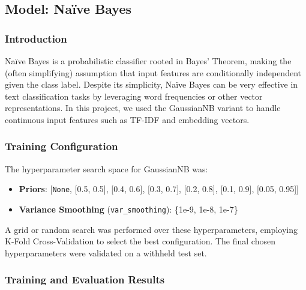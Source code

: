 \subsection{Model: Naïve Bayes}

\subsubsection{Introduction}

Naïve Bayes is a probabilistic classifier rooted in Bayes’ Theorem, making the (often simplifying) assumption that input features are conditionally independent given the class label. Despite its simplicity, Naïve Bayes can be very effective in text classification tasks by leveraging word frequencies or other vector representations. In this project, we used the GaussianNB variant to handle continuous input features such as TF-IDF and embedding vectors.

\subsubsection{Training Configuration}

The hyperparameter search space for GaussianNB was:

\begin{itemize}
    \item \textbf{Priors}: [\texttt{None}, [0.5, 0.5], [0.4, 0.6], [0.3, 0.7], [0.2, 0.8], [0.1, 0.9], [0.05, 0.95]]
    \item \textbf{Variance Smoothing} (\texttt{var\_smoothing}): \{1e-9, 1e-8, 1e-7\}
\end{itemize}



A grid or random search was performed over these hyperparameters, employing K-Fold Cross-Validation to select the best configuration. The final chosen hyperparameters were validated on a withheld test set.

\subsubsection{Training and Evaluation Results}

